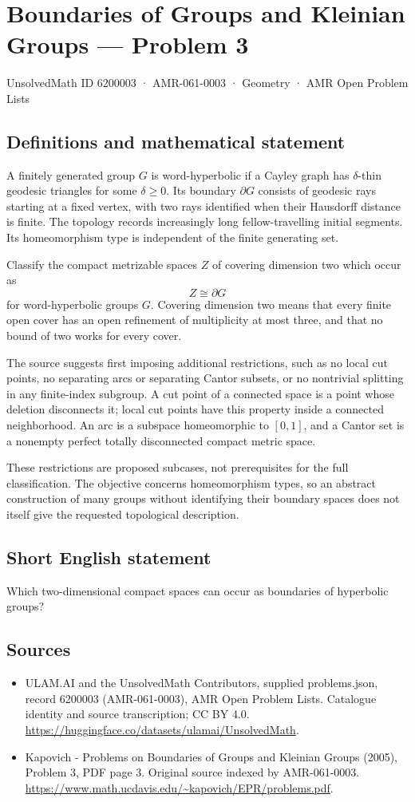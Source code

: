 \documentclass[11pt,a4paper]{article}
\begin{document}
\section*{Boundaries of Groups and Kleinian Groups — Problem 3}\label{6200003}
{\small UnsolvedMath ID 6200003 · AMR-061-0003 · Geometry · AMR Open Problem Lists}
\subsection{Definitions and mathematical statement}
A finitely generated group $G$ is word-hyperbolic if a Cayley graph has $\delta$-thin geodesic triangles for some $\delta\geq0$. Its boundary $\partial G$ consists of geodesic rays starting at a fixed vertex, with two rays identified when their Hausdorff distance is finite. The topology records increasingly long fellow-travelling initial segments. Its homeomorphism type is independent of the finite generating set.

Classify the compact metrizable spaces $Z$ of covering dimension two which occur as
\[
 Z\cong\partial G
\]
for word-hyperbolic groups $G$. Covering dimension two means that every finite open cover has an open refinement of multiplicity at most three, and that no bound of two works for every cover.

The source suggests first imposing additional restrictions, such as no local cut points, no separating arcs or separating Cantor subsets, or no nontrivial splitting in any finite-index subgroup. A cut point of a connected space is a point whose deletion disconnects it; local cut points have this property inside a connected neighborhood. An arc is a subspace homeomorphic to $[0,1]$, and a Cantor set is a nonempty perfect totally disconnected compact metric space.

These restrictions are proposed subcases, not prerequisites for the full classification. The objective concerns homeomorphism types, so an abstract construction of many groups without identifying their boundary spaces does not itself give the requested topological description.
\subsection{Short English statement}
Which two-dimensional compact spaces can occur as boundaries of hyperbolic groups?
\subsection{Sources}
\begin{itemize}
\item[S1] ULAM.AI and the UnsolvedMath Contributors, supplied problems.json, record 6200003 (AMR-061-0003), AMR Open Problem Lists. Catalogue identity and source transcription; CC BY 4.0.
\url{https://huggingface.co/datasets/ulamai/UnsolvedMath}.
\item[S2] Kapovich - Problems on Boundaries of Groups and Kleinian Groups (2005), Problem 3, PDF page 3. Original source indexed by AMR-061-0003.
\url{https://www.math.ucdavis.edu/~kapovich/EPR/problems.pdf}.
\end{itemize}
\end{document}
